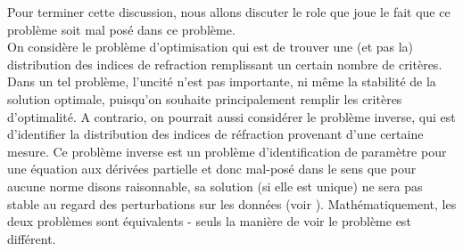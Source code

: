 \documentclass{article}
\begin{document}
Pour terminer cette discussion, nous allons discuter le role que joue le fait que ce problème soit mal posé dans ce problème.\\
On considère le problème d'optimisation qui est de trouver une (et pas la) distribution des indices de refraction remplissant un certain nombre de critères. Dans un tel problème, l'uncité n'est pas importante, ni même la stabilité de la solution optimale, puisqu'on souhaite principalement remplir les critères d'optimalité. A contrario, on pourrait aussi considérer le problème inverse, qui est d'identifier la distribution des indices de réfraction provenant d'une certaine mesure. Ce problème inverse est un problème d'identification de paramètre pour une équation aux dérivées partielle et donc mal-posé dans le sens que pour aucune norme disons raisonnable, sa solution (si elle est unique) ne sera pas stable au regard des perturbations sur les données (voir \cite{engl96regu}). Mathématiquement, les deux problèmes sont équivalents - seuls la manière de voir le problème est différent. 



\end{document}
